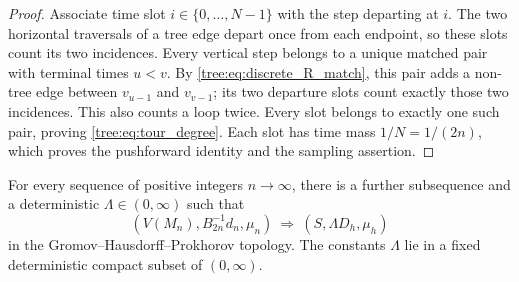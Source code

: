 \begin{proof}
Associate time slot $i\in\{0,\ldots,N-1\}$ with the step departing
at $i$. The two horizontal traversals of a tree edge depart once
from each endpoint, so these slots count its two incidences. Every
vertical step belongs to a unique matched pair with terminal times
$u<v$. By \eqref{tree:eq:discrete_R_match}, this pair adds a non-tree
edge between $v_{u-1}$ and $v_{v-1}$; its two departure slots count
exactly those two incidences. This also counts a loop twice. Every
slot belongs to exactly one such pair, proving
\eqref{tree:eq:tour_degree}. Each slot has time mass $1/N=1/(2n)$,
which proves the pushforward identity and the sampling assertion.
\end{proof}

\begin{proposition}\label{tree:prop:sphere_identification}
For every sequence of positive integers $n\to\infty$, there is a further
subsequence and a deterministic $\Lambda\in(0,\infty)$ such that
\begin{equation}\label{tree:eq:sphere_preliminary_limit}
        (V(M_n),B_{2n}^{-1}d_n,\mu_n)
              \ \Rightarrow\ (S,\Lambda D_h,\mu_h)
\end{equation}
in the Gromov--Hausdorff--Prokhorov topology. The constants $\Lambda$ lie in a
fixed deterministic compact subset of $(0,\infty)$.
\end{proposition}

